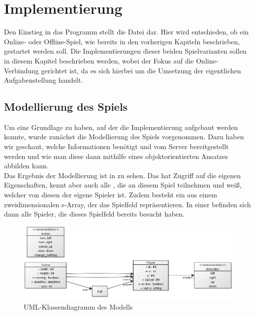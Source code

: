\chapter{Implementierung}
\label{ch:implementierung}

Den Einstieg in das Programm stellt die Datei  dar.
Hier wird entschieden, ob ein Online- oder Offline-Spiel, wie bereits in den vorherigen Kapiteln beschrieben, gestartet
werden soll.
Die Implementierungen dieser beiden Spielvarianten sollen in diesem Kapitel beschrieben werden, wobei der Fokus auf
die Online-Verbindung gerichtet ist, da es sich hierbei um die Umsetzung der eigentlichen Aufgabenstellung handelt.

\section{Modellierung des Spiels}
\label{sec:modellierung}

Um eine Grundlage zu haben, auf der die Implementierung aufgebaut werden konnte, wurde zunächst die Modellierung des
Spiels vorgenommen.
Dazu haben wir geschaut, welche Informationen benötigt und vom Server bereitgestellt werden und wie man diese dann
mithilfe eines objektorientierten Ansatzes abbilden kann. \\

Das Ergebnis der Modellierung ist in  zu sehen.
Das  hat Zugriff auf die eigenen Eigenschaften, kennt aber auch alle , die an diesem Spiel
teilnehmen und weiß, welcher von diesen der eigene Spieler ist.
Zudem besteht ein  aus einem zweidimensionalen s-Array, der das Spielfeld repräsentieren.
In einer  befinden sich dann alle Spieler, die dieses Spielfeld bereits besucht haben. \\

\begin{figure}[htb]
\centering
\includegraphics[width=\textwidth]{Bilder/Klassendiagramm_Modellierung.png}
\caption{UML-Klassendiagramm des Modells}
\label{fig:klassendiagramm-modell}
\end{figure}

